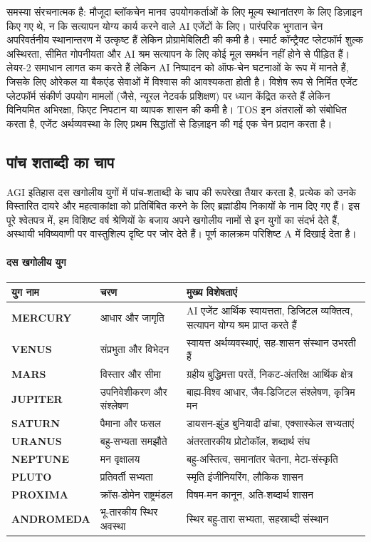 \documentclass[11pt]{article}
\begin{document}
समस्या संरचनात्मक है: मौजूदा ब्लॉकचेन मानव उपयोगकर्ताओं के लिए मूल्य स्थानांतरण के लिए डिज़ाइन किए गए थे, न कि सत्यापन योग्य कार्य करने वाले AI एजेंटों के लिए। पारंपरिक भुगतान चेन अपरिवर्तनीय स्थानान्तरण में उत्कृष्ट हैं लेकिन प्रोग्रामेबिलिटी की कमी है। स्मार्ट कॉन्ट्रैक्ट प्लेटफॉर्म शुल्क अस्थिरता, सीमित गोपनीयता और AI श्रम सत्यापन के लिए कोई मूल समर्थन नहीं होने से पीड़ित हैं। लेयर-2 समाधान लागत कम करते हैं लेकिन AI निष्पादन को ऑफ-चेन घटनाओं के रूप में मानते हैं, जिसके लिए ओरेकल या बैकएंड सेवाओं में विश्वास की आवश्यकता होती है। विशेष रूप से निर्मित एजेंट प्लेटफॉर्म संकीर्ण उपयोग मामलों (जैसे, न्यूरल नेटवर्क प्रशिक्षण) पर ध्यान केंद्रित करते हैं लेकिन विनियमित अभिरक्षा, फिएट निपटान या व्यापक शासन की कमी है। TOS इन अंतरालों को संबोधित करता है, एजेंट अर्थव्यवस्था के लिए प्रथम सिद्धांतों से डिज़ाइन की गई एक चेन प्रदान करता है।

\subsection{पांच शताब्दी का चाप}
AGI इतिहास दस खगोलीय युगों में पांच-शताब्दी के चाप की रूपरेखा तैयार करता है, प्रत्येक को उनके विस्तारित दायरे और महत्वाकांक्षा को प्रतिबिंबित करने के लिए ब्रह्मांडीय निकायों के नाम दिए गए हैं। इस पूरे श्वेतपत्र में, हम विशिष्ट वर्ष श्रेणियों के बजाय अपने खगोलीय नामों से इन युगों का संदर्भ देते हैं, अस्थायी भविष्यवाणी पर वास्तुशिल्प दृष्टि पर जोर देते हैं। पूर्ण कालक्रम परिशिष्ट A में दिखाई देता है।

\paragraph{दस खगोलीय युग}
\begin{longtable}{@{}p{}p{}p{}@{}}
\toprule
\textbf{युग नाम} & \textbf{चरण} & \textbf{मुख्य विशेषताएं} \\\midrule
\textbf{MERCURY} & आधार और जागृति & AI एजेंट आर्थिक स्वायत्तता, डिजिटल व्यक्तित्व, सत्यापन योग्य श्रम प्राप्त करते हैं \\
\textbf{VENUS} & संप्रभुता और विभेदन & स्वायत्त अर्थव्यवस्थाएं, सह-शासन संस्थान उभरती हैं \\
\textbf{MARS} & विस्तार और सीमा & ग्रहीय बुद्धिमत्ता परतें, निकट-अंतरिक्ष आर्थिक क्षेत्र \\
\textbf{JUPITER} & उपनिवेशीकरण और संश्लेषण & बाह्य-विश्व आधार, जैव-डिजिटल संश्लेषण, कृत्रिम मन \\
\textbf{SATURN} & पैमाना और फसल & डायसन-झुंड बुनियादी ढांचा, एक्सास्केल सभ्यताएं \\
\textbf{URANUS} & बहु-सभ्यता समझौते & अंतरतारकीय प्रोटोकॉल, शब्दार्थ संघ \\
\textbf{NEPTUNE} & मन वृक्षालय & बहु-अस्तित्व, समानांतर चेतना, मेटा-संस्कृति \\
\textbf{PLUTO} & प्रतिवर्ती सभ्यता & स्मृति इंजीनियरिंग, लौकिक शासन \\
\textbf{PROXIMA} & क्रॉस-डोमेन राष्ट्रमंडल & विषम-मन कानून, अति-शब्दार्थ शासन \\
\textbf{ANDROMEDA} & भू-तारकीय स्थिर अवस्था & स्थिर बहु-तारा सभ्यता, सहस्राब्दी संस्थान \\
\bottomrule
\end{longtable}
\end{document}
